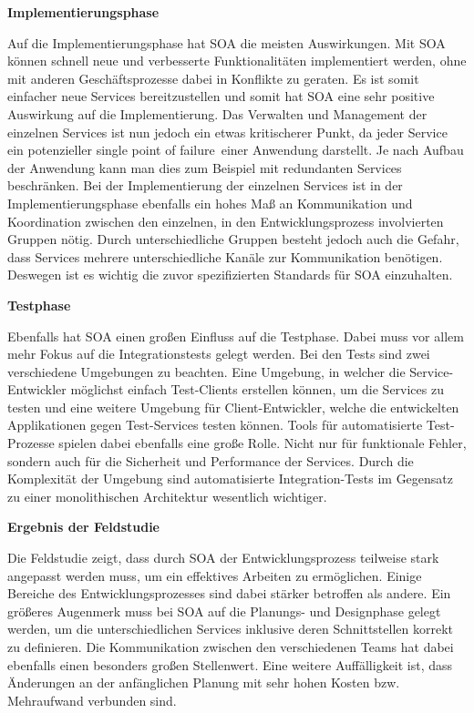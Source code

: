 


\textbf{Implementierungsphase}

Auf die Implementierungsphase hat SOA die meisten Auswirkungen. Mit SOA können schnell neue und verbesserte Funktionalitäten implementiert werden, ohne mit anderen Geschäftsprozesse dabei in Konflikte zu geraten. Es ist somit einfacher neue Services bereitzustellen und somit hat SOA eine sehr positive Auswirkung auf die Implementierung. Das Verwalten und Management der einzelnen Services ist nun jedoch ein etwas kritischerer Punkt, da jeder Service ein potenzieller \glqq single point of failure\grqq\ einer Anwendung darstellt. Je nach Aufbau der Anwendung kann man dies zum Beispiel mit redundanten Services beschränken. Bei der Implementierung der einzelnen Services ist in der Implementierungsphase ebenfalls ein hohes Maß an Kommunikation und Koordination zwischen den einzelnen, in den Entwicklungsprozess involvierten Gruppen nötig. Durch unterschiedliche Gruppen besteht jedoch auch die Gefahr, dass Services mehrere unterschiedliche Kanäle zur Kommunikation benötigen. Deswegen ist es wichtig die zuvor spezifizierten Standards für SOA einzuhalten. \cite{Haines.2010}


\textbf{Testphase}

Ebenfalls hat SOA einen großen Einfluss auf die Testphase. Dabei muss vor allem mehr Fokus auf die Integrationstests gelegt werden. Bei den Tests sind zwei verschiedene Umgebungen zu beachten. Eine Umgebung, in welcher die Service-Entwickler möglichst einfach Test-Clients erstellen können, um die Services zu testen und eine weitere Umgebung für Client-Entwickler, welche die entwickelten Applikationen gegen Test-Services testen können. Tools für automatisierte Test-Prozesse spielen dabei ebenfalls eine große Rolle. Nicht nur für funktionale Fehler, sondern auch für die Sicherheit und Performance der Services. Durch die Komplexität der Umgebung sind automatisierte Integration-Tests im Gegensatz zu einer monolithischen Architektur wesentlich wichtiger. \cite{Haines.2010}

\textbf{Ergebnis der Feldstudie}

Die Feldstudie zeigt, dass durch SOA der Entwicklungsprozess teilweise stark angepasst werden muss, um ein effektives Arbeiten zu ermöglichen. Einige Bereiche des Entwicklungsprozesses sind dabei stärker betroffen als andere. Ein größeres Augenmerk muss bei SOA auf die Planungs- und Designphase gelegt werden, um die unterschiedlichen Services inklusive deren Schnittstellen korrekt zu definieren. Die Kommunikation zwischen den verschiedenen Teams hat dabei ebenfalls einen besonders großen Stellenwert. Eine weitere Auffälligkeit ist, dass Änderungen an der anfänglichen Planung mit sehr hohen Kosten bzw. Mehraufwand verbunden sind.


